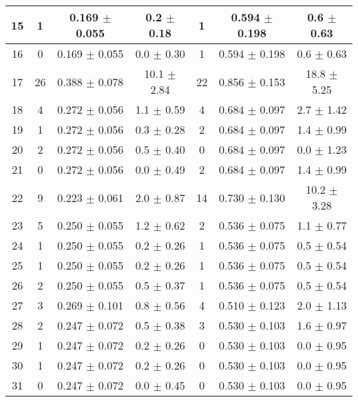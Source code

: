 \begin{table}[h!]
\begin{tabular}{c|c|c|c|c|c|c}
15 & 1  & 0.169  $\pm$  0.055  & 0.2 $\pm$ 0.18 & 1  & 0.594  $\pm$  0.198  & 0.6 $\pm$ 0.63    \\\hline
16 & 0  & 0.169  $\pm$  0.055  & 0.0 $\pm$ 0.30 & 1  & 0.594  $\pm$  0.198  & 0.6 $\pm$ 0.63    \\\hline
17 & 26  & 0.388  $\pm$  0.078  & 10.1 $\pm$ 2.84 & 22  & 0.856  $\pm$  0.153  & 18.8 $\pm$ 5.25    \\\hline
18 & 4  & 0.272  $\pm$  0.056  & 1.1 $\pm$ 0.59 & 4  & 0.684  $\pm$  0.097  & 2.7 $\pm$ 1.42    \\\hline
19 & 1  & 0.272  $\pm$  0.056  & 0.3 $\pm$ 0.28 & 2  & 0.684  $\pm$  0.097  & 1.4 $\pm$ 0.99    \\\hline
20 & 2  & 0.272  $\pm$  0.056  & 0.5 $\pm$ 0.40 & 0  & 0.684  $\pm$  0.097  & 0.0 $\pm$ 1.23    \\\hline
21 & 0  & 0.272  $\pm$  0.056  & 0.0 $\pm$ 0.49 & 2  & 0.684  $\pm$  0.097  & 1.4 $\pm$ 0.99    \\\hline
22 & 9  & 0.223  $\pm$  0.061  & 2.0 $\pm$ 0.87 & 14  & 0.730  $\pm$  0.130  & 10.2 $\pm$ 3.28    \\\hline
23 & 5  & 0.250  $\pm$  0.055  & 1.2 $\pm$ 0.62 & 2  & 0.536  $\pm$  0.075  & 1.1 $\pm$ 0.77    \\\hline
24 & 1  & 0.250  $\pm$  0.055  & 0.2 $\pm$ 0.26 & 1  & 0.536  $\pm$  0.075  & 0.5 $\pm$ 0.54    \\\hline
25 & 1  & 0.250  $\pm$  0.055  & 0.2 $\pm$ 0.26 & 1  & 0.536  $\pm$  0.075  & 0.5 $\pm$ 0.54    \\\hline
26 & 2  & 0.250  $\pm$  0.055  & 0.5 $\pm$ 0.37 & 1  & 0.536  $\pm$  0.075  & 0.5 $\pm$ 0.54    \\\hline
27 & 3  & 0.269  $\pm$  0.101  & 0.8 $\pm$ 0.56 & 4  & 0.510  $\pm$  0.123  & 2.0 $\pm$ 1.13    \\\hline
28 & 2  & 0.247  $\pm$  0.072  & 0.5 $\pm$ 0.38 & 3  & 0.530  $\pm$  0.103  & 1.6 $\pm$ 0.97    \\\hline
29 & 1  & 0.247  $\pm$  0.072  & 0.2 $\pm$ 0.26 & 0  & 0.530  $\pm$  0.103  & 0.0 $\pm$ 0.95    \\\hline
30 & 1  & 0.247  $\pm$  0.072  & 0.2 $\pm$ 0.26 & 0  & 0.530  $\pm$  0.103  & 0.0 $\pm$ 0.95    \\\hline
31 & 0  & 0.247  $\pm$  0.072  & 0.0 $\pm$ 0.45 & 0  & 0.530  $\pm$  0.103  & 0.0 $\pm$ 0.95    \\\hline
\end{tabular}
\end{table}

